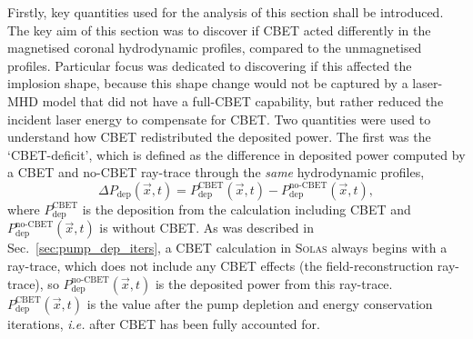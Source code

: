 Firstly, key quantities used for the analysis of this section shall be introduced.
The key aim of this section was to discover if \ac{CBET} acted differently in the magnetised coronal hydrodynamic profiles, compared to the unmagnetised profiles.
Particular focus was dedicated to discovering if this affected the implosion shape, because this shape change would not be captured by a laser-\ac{MHD} model that did not have a full-\ac{CBET} capability, but rather reduced the incident laser energy to compensate for \ac{CBET}.
Two quantities were used to understand how \ac{CBET} redistributed the deposited power.
The first was the `\ac{CBET}-deficit', which is defined as the difference in deposited power computed by a \ac{CBET} and no-\ac{CBET} ray-trace through the \textit{same} hydrodynamic profiles,
\begin{equation}
    \Delta P_{\text{dep}}(\vec{x},t) = P_{\text{dep}}^{\text{CBET}}(\vec{x},t) - P_{\text{dep}}^{\text{no-CBET}}(\vec{x},t),
\end{equation}
where $P_{\text{dep}}^{\text{CBET}}$ is the deposition from the calculation including \ac{CBET} and $P_{\text{dep}}^{\text{no-CBET}}(\vec{x},t)$ is without \ac{CBET}.
As was described in Sec.~\ref{sec:pump_dep_iters}, a \ac{CBET} calculation in \textsc{Solas} always begins with a ray-trace, which does not include any \ac{CBET} effects (the field-reconstruction ray-trace), so $P_{\text{dep}}^{\text{no-CBET}}(\vec{x},t)$ is the deposited power from this ray-trace.
$P_{\text{dep}}^{\text{CBET}}(\vec{x},t)$ is the value after the pump depletion and energy conservation iterations, \textit{i.e.} after \ac{CBET} has been fully accounted for.

